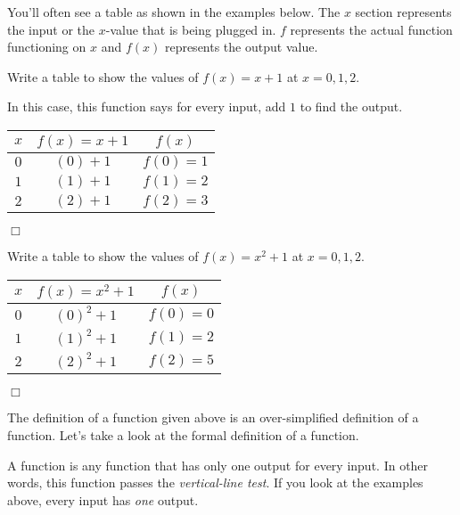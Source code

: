 \documentclass[lang=en,11pt]{elegantbook}
\begin{document}
You'll often see a table as shown in the examples below.  The $x$ section represents the input or the $x$-value that is being plugged in.  $f$ represents the actual function functioning on $x$ and $f(x)$ represents the output value.
\begin{example}
Write a table to show the values of $f(x)=x+1$ at $x=0,1,2$.
\end{example}
\begin{solution}
In this case, this function says for every input, add $1$ to find the output.
\begin{center}
\begin{tabular}{ |c|c|c| } 
 \hline
 $x$ & $f(x)=x+1$ & $f(x)$ \\ 
 \hline
 $0$ & $(0)+1$ & $f(0)=1$ \\ 
 $1$ & $(1)+1$ & $f(1)=2$ \\
 $2$ & $(2)+1$ & $f(2)=3$ \\
 \hline
\end{tabular}
\end{center}$\Box$
\end{solution}
\begin{example}
Write a table to show the values of $f(x)=x^2+1$ at $x=0,1,2$.
\end{example}
\begin{solution}
\begin{center}
\begin{tabular}{ |c|c|c| } 
 \hline
 $x$ & $f(x)=x^2+1$ & $f(x)$ \\ 
 \hline
 $0$ & $(0)^2+1$ & $f(0)=0$ \\ 
 $1$ & $(1)^2+1$ & $f(1)=2$ \\
 $2$ & $(2)^2+1$ & $f(2)=5$ \\
 \hline
\end{tabular}
\end{center}$\Box$
\end{solution}
\noindent The definition of a function given above is an over-simplified definition of a function.  Let's take a look at the formal definition of a function.

A function is any function that has only one output for every input.  In other words, this function passes the \textit{vertical-line test}.  If you look at the examples above, every input has \textit{one} output.  
\end{document}
